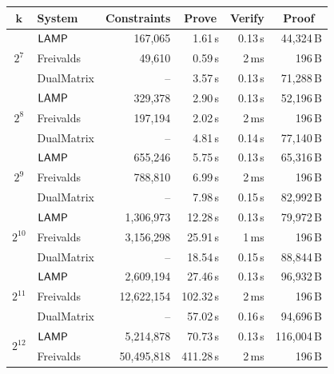 


\begin{table}[!t]
\centering
\scriptsize
\setlength{\tabcolsep}{1.5pt}
\renewcommand{\arraystretch}{1.05}
\begin{revblock}[unbreakable]
\begin{tabular*}{\linewidth}{@{\extracolsep{\fill}}clrrrr@{}}
\toprule
\(\boldsymbol{k}\) & \textbf{System}
& \multicolumn{1}{c}{\textbf{Constraints}}
& \multicolumn{1}{c}{\textbf{Prove}}
& \multicolumn{1}{c}{\textbf{Verify}}
& \multicolumn{1}{c}{\textbf{Proof}} \\
\midrule
\multirow{3}{*}{$2^7$} & \(\textsf{LAMP}\) & 167{,}065 & 1.61\,s & 0.13\,s & 44{,}324\,B \\
           & Freivalds & 49{,}610 & 0.59\,s & 2\,ms & 196\,B \\
           & DualMatrix & -- & 3.57\,s & 0.13\,s & 71{,}288\,B \\
\midrule
\multirow{3}{*}{$2^8$} & \(\textsf{LAMP}\) & 329{,}378 & 2.90\,s & 0.13\,s & 52{,}196\,B \\
           & Freivalds & 197{,}194 & 2.02\,s & 2\,ms & 196\,B \\
           & DualMatrix & -- & 4.81\,s & 0.14\,s & 77{,}140\,B \\
\midrule
\multirow{3}{*}{$2^9$} & \(\textsf{LAMP}\) & 655{,}246 & 5.75\,s & 0.13\,s & 65{,}316\,B \\
           & Freivalds & 788{,}810 & 6.99\,s & 2\,ms & 196\,B \\
           & DualMatrix & -- & 7.98\,s & 0.15\,s & 82{,}992\,B \\
\midrule
\multirow{3}{*}{$2^{10}$} & \(\textsf{LAMP}\) & 1{,}306{,}973 & 12.28\,s & 0.13\,s & 79{,}972\,B \\
           & Freivalds & 3{,}156{,}298 & 25.91\,s & 1\,ms & 196\,B \\
           & DualMatrix & -- & 18.54\,s & 0.15\,s & 88{,}844\,B \\
\midrule
\multirow{3}{*}{$2^{11}$} & \(\textsf{LAMP}\) & 2{,}609{,}194 & 27.46\,s & 0.13\,s & 96{,}932\,B \\
           & Freivalds & 12{,}622{,}154 & 102.32\,s & 2\,ms & 196\,B \\
           & DualMatrix & -- & 57.02\,s & 0.16\,s & 94{,}696\,B \\
\midrule
\multirow{3}{*}{$2^{12}$} & \(\textsf{LAMP}\) & 5{,}214{,}878 & 70.73\,s & 0.13\,s & 116{,}004\,B \\
           & Freivalds & 50{,}495{,}818 & 411.28\,s & 2\,ms & 196\,B \\

\end{tabular*}
\end{revblock}
\end{table}
